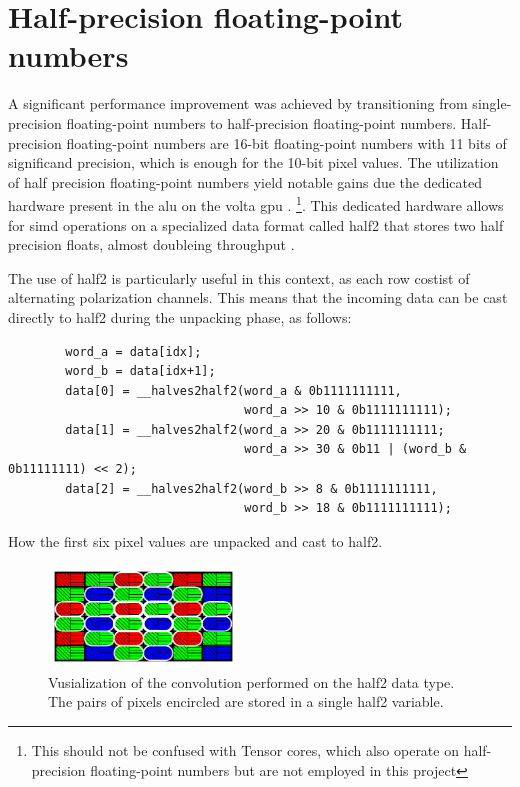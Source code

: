\section{Half-precision floating-point numbers}
A significant performance improvement was achieved by transitioning from single-precision floating-point numbers to half-precision floating-point numbers.
Half-precision floating-point numbers are 16-bit floating-point numbers with 11 bits of significand precision, which is enough for the 10-bit pixel values.
The utilization of half precision floating-point numbers yield notable gains due the dedicated hardware present in the \gls{alu} on the \gls{volta} \gls{gpu} \cite{CUDA2023}.
\footnote{This should not be confused with Tensor cores, which also operate on half-precision floating-point numbers but are not employed in this project}.
This dedicated hardware allows for \gls{simd} operations on a specialized data format called \gls{half2} that stores two half precision floats, almost doubleing throughput \cite{nvidiaHalf2ArithmeticFunctions2023}\cite{hoExploitingHalfPrecision2017}.

The use of \gls{half2} is particularly useful in this context, as each row costist of alternating polarization channels.
This means that the incoming data can be cast directly to \gls{half2} during the unpacking phase, as follows:
\begin{listing}[H]
    \begin{verbatim}
        word_a = data[idx];
        word_b = data[idx+1];
        data[0] = __halves2half2(word_a & 0b1111111111,
                                 word_a >> 10 & 0b1111111111);
        data[1] = __halves2half2(word_a >> 20 & 0b1111111111;
                                 word_a >> 30 & 0b11 | (word_b & 0b11111111) << 2);
        data[2] = __halves2half2(word_b >> 8 & 0b1111111111,
                                 word_b >> 18 & 0b1111111111);
    \end{verbatim}
    \caption{How the first six pixel values are unpacked and cast to \gls{half2}.}
    \label{lst:unpacking_half2}
\end{listing}


\begin{figure}[H]
    \centering
    \includegraphics[width=0.45\textwidth]{figures/polarized_image/half2_conv.pdf}
    \caption{Vusialization of the convolution performed on the \gls{half2} data type. The pairs of pixels encircled are stored in a single \gls{half2} variable.}
    \label{fig:half2_conv}
\end{figure}

